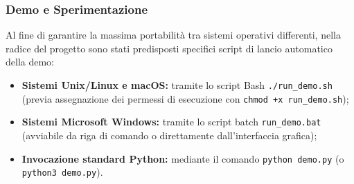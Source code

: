\subsubsection{Demo e Sperimentazione}
Al fine di garantire la massima portabilità tra sistemi operativi differenti, nella radice del progetto sono stati predisposti specifici script di lancio automatico della demo:
\begin{itemize}
	\item \textbf{Sistemi Unix/Linux e macOS:} tramite lo script Bash \texttt{./run\_demo.sh} (previa assegnazione dei permessi di esecuzione con \texttt{chmod +x run\_demo.sh});
	\item \textbf{Sistemi Microsoft Windows:} tramite lo script batch \texttt{run\_demo.bat} (avviabile da riga di comando o direttamente dall'interfaccia grafica);
	\item \textbf{Invocazione standard Python:} mediante il comando \texttt{python demo.py} (o \texttt{python3 demo.py}).
\end{itemize}

